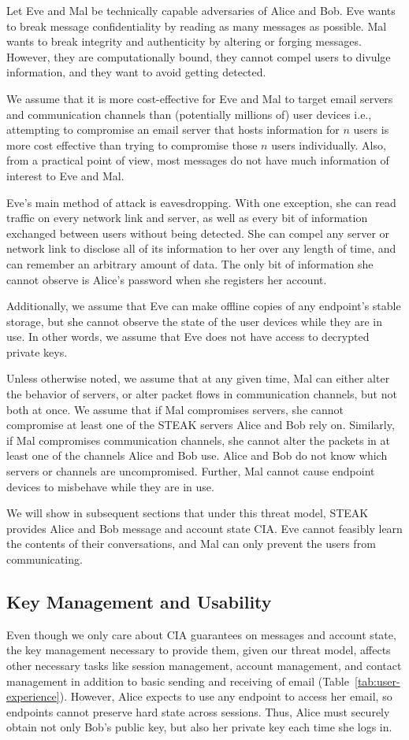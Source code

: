 Let Eve and Mal be technically capable adversaries of Alice and Bob.  Eve wants to break message confidentiality by reading as many messages as possible.  Mal wants to break integrity and authenticity by altering or forging messages.  However, they are computationally bound, they cannot compel users to divulge information, and they want to avoid getting detected.

We assume that it is more cost-effective for Eve and Mal to target email servers and communication channels than (potentially millions of) user devices i.e., attempting to compromise an email server that hosts information for $n$ users is more cost effective than trying to compromise those $n$ users individually. Also, from a practical point of view, most messages do not have much information of interest to Eve and Mal.

Eve's main method of attack is eavesdropping.  With one exception, she can read traffic on every network link and server, as well as every bit of information exchanged between users without being detected.  She can compel any server or network link to disclose all of its information to her over any length of time, and can remember an arbitrary amount of data.  The only bit of information she cannot observe is Alice's password when she registers her account.

Additionally, we assume that Eve can make offline copies of any endpoint's stable storage, but she cannot observe the state of the user devices while they are in use. In other words, we assume that Eve does not have access to decrypted private keys.  

Unless otherwise noted, we assume that at any given time, Mal can either alter the behavior of servers, or alter packet flows in communication channels, but not both at once. We assume that if Mal compromises servers, she cannot compromise at least one of the STEAK servers Alice and Bob rely on. Similarly, if Mal compromises communication channels, she cannot alter the packets in at least one of the channels Alice and Bob use.  Alice and Bob do not know which servers or channels are uncompromised.  Further, Mal cannot cause endpoint devices to misbehave while they are in use.

We will show in subsequent sections that under this threat model, STEAK provides Alice and Bob message and account state CIA.  Eve cannot feasibly learn the contents of their conversations, and Mal can only prevent the users from communicating.

\subsection{Key Management and Usability}
Even though we only care about CIA guarantees on messages and account 
state, the key management necessary to provide them, given our threat 
model, affects other necessary tasks like session management, account 
management, and contact management in addition to basic sending and 
receiving of email (Table~\ref{tab:user-experience}). However, Alice
expects to use any endpoint to access
her email, so endpoints cannot preserve hard state across sessions.  
Thus, Alice must securely obtain not only Bob's public key, 
but also her private key each time she logs in.

